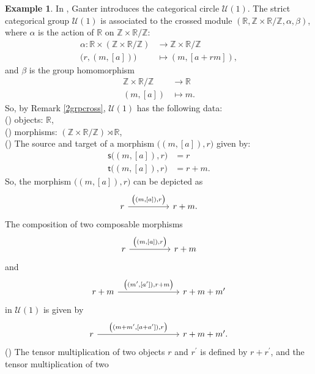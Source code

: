 \documentclass{article}
\theoremstyle{plain}
\theoremstyle{definition}
\newtheorem{exa}[thm]{Example}
\newcommand{\rNum}[1]{\lowercase\expandafter{\romannumeral #1\relax}}
\begin{document}
\begin{exa}
In \cite[Section 3 on page 5]{MR3764535}, Ganter introduces the categorical circle $\mathcal{U}(1)$. The strict categorical group $\mathcal{U}(1)$ is associated to the crossed module $(\mathbb{R},\mathbb{Z} \times \mathbb{R}/\mathbb{Z},\alpha,\beta)$, where $\alpha$ is the action of $\mathbb{R}$ on $\mathbb{Z} \times \mathbb{R}/\mathbb{Z}$:
\begin{align*}
\alpha:\mathbb{R} \times (\mathbb{Z} \times \mathbb{R}/\mathbb{Z}) & \longrightarrow \mathbb{Z} \times \mathbb{R}/\mathbb{Z} \\
\bigl(r,(m,[a])\bigr) ~~ & \mapsto (m,[a+rm]),
\end{align*}
and $\beta$ is the group homomorphism
\begin{align*}
\mathbb{Z} \times \mathbb{R}/\mathbb{Z} & \longrightarrow \mathbb{R} \\
(m,[a]) & \mapsto m.
\end{align*}
So, by Remark \ref{2grpcross}, $\mathcal{U}(1)$ has the following data: \\
(\rNum{1}) objects: $\mathbb{R}$, \\
(\rNum{2}) morphisms: $(\mathbb{Z} \times \mathbb{R}/\mathbb{Z}) \rtimes \mathbb{R}$, \\
(\rNum{3}) The source and target of a morphism $\bigl((m,[a]),r\bigr)$ given by:
\begin{align*}
\mathsf{s}\bigl((m,[a]),r\bigr) & = r \\
\mathsf{t}\bigl((m,[a]),r\bigr) & = r + m.
\end{align*}
So, the morphism $\bigl((m,[a]),r\bigr)$ can be depicted as
\[
\begin{tikzcd}
r \arrow[rr,"{\bigl((m,[a]),r\bigr)}"] & & r + m.
\end{tikzcd}
\]
The composition of two composable morphisms
\[
\begin{tikzcd}
r \arrow[rr,"{\bigl((m,[a]),r\bigr)}"] & & r + m
\end{tikzcd}
\]
and 
\[
\begin{tikzcd}
r + m \arrow[rrr,"{\bigl((m^\prime,[a^\prime]),r+m\bigr)}"] & & & r + m + m^\prime
\end{tikzcd}
\]
in $\mathcal{U}(1)$ is given by
\[
\begin{tikzcd}
r \arrow[rrrr,"{\bigl((m+m^\prime,[a+a^\prime]),r\bigr)}"] & & & & r + m + m^\prime.
\end{tikzcd}
\]
(\rNum{5}) The tensor multiplication of two objects $r$ and $r^\prime$ is defined by $r + r^\prime$, and the tensor multiplication of two

\end{exa}
\end{document}
